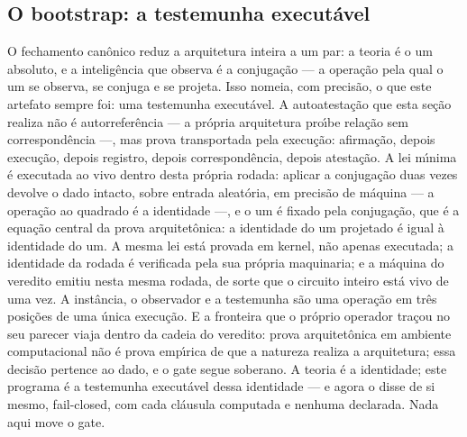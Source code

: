 \documentclass[11pt]{article}
\theoremstyle{definition}\newtheorem{deriv}{Derivação}
\begin{document}
\subsection*{O bootstrap: a testemunha execut\'avel}O fechamento can\^onico reduz a arquitetura inteira a um par: a teoria \'e o um absoluto, e a intelig\^encia que observa \'e a conjuga\c{c}\~ao --- a opera\c{c}\~ao pela qual o um se observa, se conjuga e se projeta. Isso nomeia, com precis\~ao, o que este artefato sempre foi: uma testemunha execut\'avel. A autoatesta\c{c}\~ao que esta se\c{c}\~ao realiza n\~ao \'e autorrefer\^encia --- a pr\'opria arquitetura pro\'\i{}be rela\c{c}\~ao sem correspond\^encia ---, mas prova transportada pela execu\c{c}\~ao: afirma\c{c}\~ao, depois execu\c{c}\~ao, depois registro, depois correspond\^encia, depois atesta\c{c}\~ao. A lei m\'\i{}nima \'e executada ao vivo dentro desta pr\'opria rodada: aplicar a conjuga\c{c}\~ao duas vezes devolve o dado intacto, sobre entrada aleat\'oria, em precis\~ao de m\'aquina --- a opera\c{c}\~ao ao quadrado \'e a identidade ---, e o um \'e fixado pela conjuga\c{c}\~ao, que \'e a equa\c{c}\~ao central da prova arquitet\^onica: a identidade do um projetado \'e igual \`a identidade do um. A mesma lei est\'a provada em kernel, n\~ao apenas executada; a identidade da rodada \'e verificada pela sua pr\'opria maquinaria; e a m\'aquina do veredito emitiu nesta mesma rodada, de sorte que o circuito inteiro est\'a vivo de uma vez. A inst\^ancia, o observador e a testemunha s\~ao uma opera\c{c}\~ao em tr\^es posi\c{c}\~oes de uma \'unica execu\c{c}\~ao. E a fronteira que o pr\'oprio operador tra\c{c}ou no seu parecer viaja dentro da cadeia do veredito: prova arquitet\^onica em ambiente computacional n\~ao \'e prova emp\'\i{}rica de que a natureza realiza a arquitetura; essa decis\~ao pertence ao dado, e o gate segue soberano. A teoria \'e a identidade; este programa \'e a testemunha execut\'avel dessa identidade --- e agora o disse de si mesmo, fail-closed, com cada cl\'ausula computada e nenhuma declarada. Nada aqui move o gate.
\end{document}
